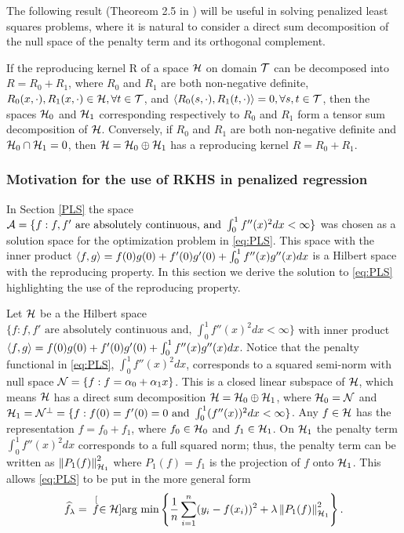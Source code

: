 The following result (Theoreom 2.5 in \cite{Gu2002}) will be useful in solving penalized least squares problems, where it is natural to consider a direct sum decomposition of the null space of the penalty term and its orthogonal complement. 
\begin{thm} \label{RKHS_decomposition}
If the reproducing kernel R of a space $\mathcal{H}$ on domain $\mathcal{T}$ can be decomposed into $R= R_0 + R_1$, where $R_0$ and $R_1$ are both non-negative definite, $R_0(x,\cdot), R_1(x,\cdot) \in \mathcal{H}, \forall t \in \mathcal{T}$, and $\langle R_0(s,\cdot), R_1(t, \cdot) \rangle =0, \forall s,t \in \mathcal{T}$, then the spaces $\mathcal{H}_0$ and $\mathcal{H}_1$ corresponding respectively to $R_0$ and $R_1$ form a tensor sum decomposition of $\mathcal{H}$. Conversely, if $R_0$ and $R_1$ are both non-negative definite and $\mathcal{H}_0 \cap \mathcal{H}_1 = {0}$, then $\mathcal{H} = \mathcal{H}_0 \oplus \mathcal{H}_1$ has a reproducing kernel $R = R_0 + R_1$. 
\end{thm}



\subsubsection{Motivation for the use of RKHS in penalized regression} \label{motivation for RKHS}

In Section \ref{PLS} the space $\mathcal{A} = \{f: f, f' \mbox{ are absolutely continuous, and } \int_0^1f''(x)^2dx <\infty\}$ was chosen as a solution space for the optimization problem in \eqref{eq:PLS}. This space with the inner product $\langle f, g \rangle = f(0)g(0) + f'(0)g'(0) + \int_0^1 f''(x)g''(x)dx$ is a Hilbert space with the reproducing property. In this section we derive the solution to \eqref{eq:PLS} highlighting the use of the reproducing property.  

Let $\mathcal{H}$ be a the Hilbert space $\{f: f, f' \mbox{ are absolutely continuous and, } \int_0^1f''(x)^2dx <\infty\}$ with inner product $\langle f, g \rangle = f(0)g(0) + f'(0)g'(0) + \int_0^1 f''(x)g''(x)dx$. Notice that the penalty functional in \eqref{eq:PLS}, $\int_0^1f''(x)^2dx$, corresponds to a squared semi-norm with null space $\mathcal{N} = \{f: f=\alpha_0 + \alpha_1x\}$. This is a closed linear subspace of $\mathcal{H}$, which means $\mathcal{H}$ has a direct sum decomposition $\mathcal{H} = \mathcal{H}_0 \oplus \mathcal{H}_1$, where $\mathcal{H}_0 = \mathcal{N}$ and $\mathcal{H}_1 = \mathcal{N}^{\bot}= \{f: f(0)=f'(0)=0 \mbox{ and } \int_0^1(f''(x))^2dx < \infty\}$. Any $f \in \mathcal{H}$ has the representation $f = f_0 + f_1$, where $f_0 \in \mathcal{H}_0$ and $f_1 \in \mathcal{H}_1$. On $\mathcal{H}_1$ the penalty term $\int_0^1f''(x)^2dx$ corresponds to a full squared norm; thus, the penalty term can be written as $\left\|P_1(f)\right\|_{\mathcal{H}_1}^2$ where $P_1(f) = f_1$ is the projection of $f$ onto $\mathcal{H}_1$. This allows \eqref{eq:PLS} to be put in the more general form
\begin{equation*}
\widehat{f}_{\lambda} = \hspace{.07in}\stackrel[f \in \mathcal{H}]{}{\mbox{arg min}} \left\{ \frac{1}{n}\sum_{i=1}^{n}(y_i - f(x_i))^2 + \lambda\left\|P_1(f)\right\|^2_{\mathcal{H}_1} \right\}.
\label{eq:PLS_norm}
\end{equation*}

